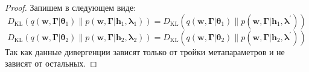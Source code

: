 \documentclass[12pt]{article}
\numberwithin{equation}{section}
\begin{document}
	\begin{proof}
		Запишем в следующем виде:
		$$D_{\mathrm{KL}}\left(q\left(\mathbf{w}, \mathbf{\Gamma} | \boldsymbol{\theta}_{1}\right) \| p\left(\mathbf{w}, \mathbf{\Gamma} | \mathbf{h}_{1}, \boldsymbol{\lambda}_{1}\right)\right)=D_{\mathrm{KL}}\left(q\left(\mathbf{w}, \boldsymbol{\Gamma} | \boldsymbol{\theta}_{1}\right) \| p\left(\mathbf{w}, \mathbf{\Gamma} | \mathbf{h}_{1}, \boldsymbol{\lambda}^{\prime}\right)\right)$$
		$$
		D_{\mathrm{KL}}\left(q\left(\mathbf{w}, \mathbf{\Gamma} | \boldsymbol{\theta}_{2}\right) \| p\left(\mathbf{w}, \mathbf{\Gamma} | \mathbf{h}_{2}, \boldsymbol{\lambda}_{2}\right)\right)=D_{\mathrm{KL}}\left(q\left(\mathbf{w}, \mathbf{\Gamma} | \boldsymbol{\theta}_{2}\right) \| p\left(\mathbf{w}, \mathbf{\Gamma} | \mathbf{h}_{2}, \boldsymbol{\lambda}^{\prime}\right)\right)
		$$
		Так как данные дивергенции зависят только от тройки метапараметров и не зависят от остальных.
		

\end{proof}
\end{document}

